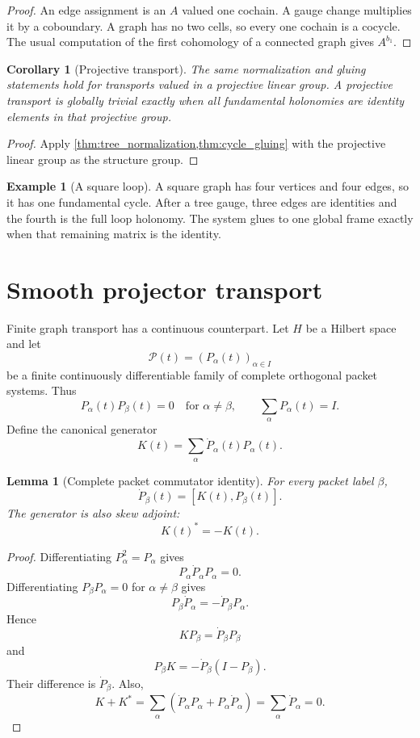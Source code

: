 \documentclass{aomart}
\newtheorem{lemma}[lemma]{Lemma}
\newtheorem{corollary}[corollary]{Corollary}
\theoremstyle{definition}
\newtheorem{example}[example]{Example}
\theoremstyle{remark}
\newcommand{\Pcal}{\mathcal P}
\begin{document}
\begin{proof}
An edge assignment is an $A$ valued one cochain.  A gauge change multiplies it by a coboundary.  A graph has no two cells, so every one cochain is a cocycle.  The usual computation of the first cohomology of a connected graph gives $A^{b_1}$.
\end{proof}

\begin{corollary}[Projective transport]\label{cor:projective_transport}
The same normalization and gluing statements hold for transports valued in a projective linear group.  A projective transport is globally trivial exactly when all fundamental holonomies are identity elements in that projective group.
\end{corollary}

\begin{proof}
Apply \cref{thm:tree_normalization,thm:cycle_gluing} with the projective linear group as the structure group.
\end{proof}

\begin{example}[A square loop]\label{ex:square_loop}
A square graph has four vertices and four edges, so it has one fundamental cycle.  After a tree gauge, three edges are identities and the fourth is the full loop holonomy.  The system glues to one global frame exactly when that remaining matrix is the identity.
\end{example}

\section{Smooth projector transport}\label{sec:kato_transport}

Finite graph transport has a continuous counterpart.  Let $H$ be a Hilbert space and let
\[
\Pcal(t)=(P_\alpha(t))_{\alpha\in I}
\]
be a finite continuously differentiable family of complete orthogonal packet systems.  Thus
\[
P_\alpha(t)P_\beta(t)=0
\quad\text{for }\alpha\ne\beta,
\qquad
\sum_\alpha P_\alpha(t)=I.
\]
Define the canonical generator
\[
K(t)=\sum_\alpha \dot P_\alpha(t)P_\alpha(t).
\]

\begin{lemma}[Complete packet commutator identity]\label{lem:packet_commutator}
For every packet label $\beta$,
\[
\dot P_\beta(t)=[K(t),P_\beta(t)].
\]
The generator is also skew adjoint:
\[
K(t)^*=-K(t).
\]
\end{lemma}

\begin{proof}
Differentiating $P_\alpha^2=P_\alpha$ gives
\[
P_\alpha\dot P_\alpha P_\alpha=0.
\]
Differentiating $P_\beta P_\alpha=0$ for $\alpha\ne\beta$ gives
\[
P_\beta\dot P_\alpha=-\dot P_\beta P_\alpha.
\]
Hence
\[
K P_\beta=\dot P_\beta P_\beta
\]
and
\[
P_\beta K=-\dot P_\beta(I-P_\beta).
\]
Their difference is $\dot P_\beta$.  Also,
\[
K+K^*
=
\sum_\alpha(\dot P_\alpha P_\alpha+P_\alpha\dot P_\alpha)
=
\sum_\alpha\dot P_\alpha
=0.
\]
\end{proof}
\end{document}

